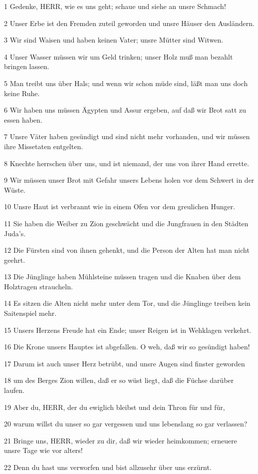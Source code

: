 \par 1 Gedenke, HERR, wie es uns geht; schaue und siehe an unsre Schmach!
\par 2 Unser Erbe ist den Fremden zuteil geworden und unsre Häuser den Ausländern.
\par 3 Wir sind Waisen und haben keinen Vater; unsre Mütter sind Witwen.
\par 4 Unser Wasser müssen wir um Geld trinken; unser Holz muß man bezahlt bringen lassen.
\par 5 Man treibt uns über Hals; und wenn wir schon müde sind, läßt man uns doch keine Ruhe.
\par 6 Wir haben uns müssen Ägypten und Assur ergeben, auf daß wir Brot satt zu essen haben.
\par 7 Unsre Väter haben gesündigt und sind nicht mehr vorhanden, und wir müssen ihre Missetaten entgelten.
\par 8 Knechte herrschen über uns, und ist niemand, der uns von ihrer Hand errette.
\par 9 Wir müssen unser Brot mit Gefahr unsers Lebens holen vor dem Schwert in der Wüste.
\par 10 Unsre Haut ist verbrannt wie in einem Ofen vor dem greulichen Hunger.
\par 11 Sie haben die Weiber zu Zion geschwächt und die Jungfrauen in den Städten Juda's.
\par 12 Die Fürsten sind von ihnen gehenkt, und die Person der Alten hat man nicht geehrt.
\par 13 Die Jünglinge haben Mühlsteine müssen tragen und die Knaben über dem Holztragen straucheln.
\par 14 Es sitzen die Alten nicht mehr unter dem Tor, und die Jünglinge treiben kein Saitenspiel mehr.
\par 15 Unsers Herzens Freude hat ein Ende; unser Reigen ist in Wehklagen verkehrt.
\par 16 Die Krone unsers Hauptes ist abgefallen. O weh, daß wir so gesündigt haben!
\par 17 Darum ist auch unser Herz betrübt, und unsre Augen sind finster geworden
\par 18 um des Berges Zion willen, daß er so wüst liegt, daß die Füchse darüber laufen.
\par 19 Aber du, HERR, der du ewiglich bleibst und dein Thron für und für,
\par 20 warum willst du unser so gar vergessen und uns lebenslang so gar verlassen?
\par 21 Bringe uns, HERR, wieder zu dir, daß wir wieder heimkommen; erneuere unsre Tage wie vor alters!
\par 22 Denn du hast uns verworfen und bist allzusehr über uns erzürnt.


